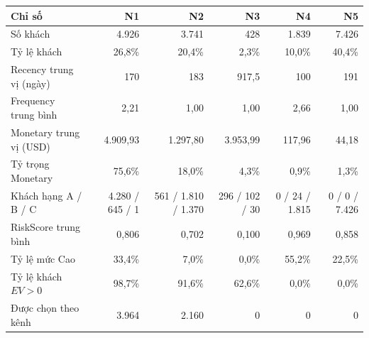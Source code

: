 \begin{tabular}{lrrrrr}
\toprule
Chỉ số & N1 & N2 & N3 & N4 & N5 \\
\midrule
Số khách & 4.926 & 3.741 & 428 & 1.839 & 7.426 \\
Tỷ lệ khách & 26,8\% & 20,4\% & 2,3\% & 10,0\% & 40,4\% \\
Recency trung vị (ngày) & 170 & 183 & 917,5 & 100 & 191 \\
Frequency trung bình & 2,21 & 1,00 & 1,00 & 2,66 & 1,00 \\
Monetary trung vị (USD) & 4.909,93 & 1.297,80 & 3.953,99 & 117,96 & 44,18 \\
Tỷ trọng Monetary & 75,6\% & 18,0\% & 4,3\% & 0,9\% & 1,3\% \\
Khách hạng A / B / C & 4.280 / 645 / 1 & 561 / 1.810 / 1.370 & 296 / 102 / 30 & 0 / 24 / 1.815 & 0 / 0 / 7.426 \\
RiskScore trung bình & 0,806 & 0,702 & 0,100 & 0,969 & 0,858 \\
Tỷ lệ mức Cao & 33,4\% & 7,0\% & 0,0\% & 55,2\% & 22,5\% \\
Tỷ lệ khách $EV>0$ & 98,7\% & 91,6\% & 62,6\% & 0,0\% & 0,0\% \\
Được chọn theo kênh & 3.964 & 2.160 & 0 & 0 & 0 \\
\bottomrule
\end{tabular}
